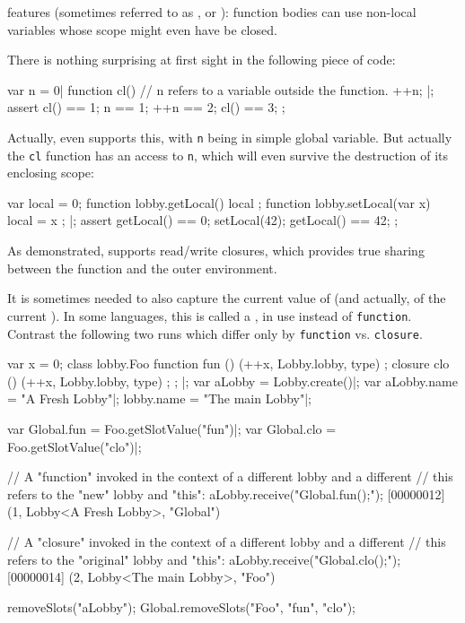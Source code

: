 \us features  (sometimes referred to as , or ): function bodies can use non-local
variables whose scope might even have be closed.

There is nothing surprising at first sight in the following piece of code:
\begin{urbiscript}
var n = 0|
function cl()
{
  // n refers to a variable outside the function.
  ++n;
}|;
assert
{
  cl() == 1;
     n == 1;
   ++n == 2;
  cl() == 3;
};
\end{urbiscript}

\noindent
Actually, even \langC supports this, with \lstinline{n} being in simple global
variable.  But actually the \lstinline{cl} function has  an
access to \lstinline{n}, which will even survive the destruction of its
enclosing scope:

\begin{urbiscript}
{
  var local = 0;
  function lobby.getLocal() { local };
  function lobby.setLocal(var x) { local = x };
}|;
assert
{
  getLocal() == 0;
  setLocal(42);
  getLocal() == 42;
};
\end{urbiscript}

As demonstrated, \us supports read/write closures, which provides true
sharing between the function and the outer environment.


It is sometimes needed to also capture the current value of \this (and
actually, of the current ).  In some languages, this is
called a , in \us use  instead of
\lstinline{function}.  Contrast the following two runs which differ only by
\lstinline{function} vs. \lstinline{closure}.

\begin{urbiscript}
{
  var x = 0;
  class lobby.Foo
  {
    function fun () { (++x, Lobby.lobby, type) };
    closure  clo () { (++x, Lobby.lobby, type) };
  };
}|;
var aLobby = Lobby.create()|;
var aLobby.name = "A Fresh Lobby"|;
lobby.name = "The main Lobby"|;

var Global.fun = Foo.getSlotValue("fun")|;
var Global.clo = Foo.getSlotValue("clo")|;

// A "function" invoked in the context of a different lobby and a different
// this refers to the "new" lobby and "this":
aLobby.receive("Global.fun();");
[00000012] (1, Lobby<A Fresh Lobby>, "Global")

// A "closure" invoked in the context of a different lobby and a different
// this refers to the "original" lobby and "this":
aLobby.receive("Global.clo();");
[00000014] (2, Lobby<The main Lobby>, "Foo")
\end{urbiscript}
\begin{urbicomment}
removeSlots("aLobby");
Global.removeSlots("Foo", "fun", "clo");
\end{urbicomment}


